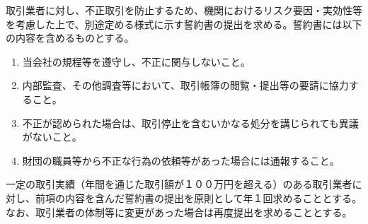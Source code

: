 \documentclass[10pt,a4paper,uplatex]{jsarticle}
\begin{document}
取引業者に対し、不正取引を防止するため、機関におけるリスク要因・実効性等を考慮した上で、別途定める様式に示す誓約書の提出を求める。誓約書には以下の内容を含めるものとする。
\begin{enumerate}
	\item 当会社の規程等を遵守し、不正に関与しないこと。
	\item 内部監査、その他調査等において、取引帳簿の閲覧・提出等の要請に協力すること。
	\item 不正が認められた場合は、取引停止を含むいかなる処分を講じられても異議がないこと。
	\item 財団の職員等から不正な行為の依頼等があった場合には通報すること。
\end{enumerate}
\term 一定の取引実績（年間を通じた取引額が１００万円を超える）のある取引業者に対し、前項の内容を含んだ誓約書の提出を原則として年１回求めることとする。なお、取引業者の体制等に変更があった場合は再度提出を求めることとする。
\end{document}
